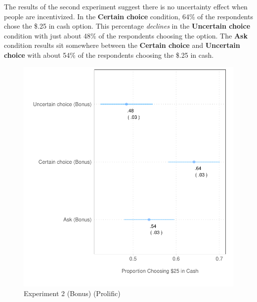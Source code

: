 \documentclass[12pt, letterpaper]{article}
\begin{document}
The results of the second experiment suggest there is no uncertainty effect when people are incentivized. In the \textbf{Certain choice} condition, 64\% of the respondents chose the \$.25 in cash option. This percentage \textit{declines} in the \textbf{Uncertain choice} condition with just about 48\% of the respondents choosing the option. The \textbf{Ask} condition results sit somewhere between the \textbf{Certain choice} and \textbf{Uncertain choice} with about 54\% of the respondents choosing the \$.25 in cash.

\begin{figure}[h]
    \centering
    \includegraphics{figs/prolific_exp2.pdf}
    \caption{Experiment 2 (Bonus) (Prolific)}
    \label{fig:exp_2_prolific}
\end{figure}
\clearpage


\clearpage

\appendix
\renewcommand{\thesection}{SI \arabic{section}}
\renewcommand\thetable{\thesection.\arabic{table}}  
\renewcommand\thefigure{\thesection.\arabic{figure}}
\end{document}
